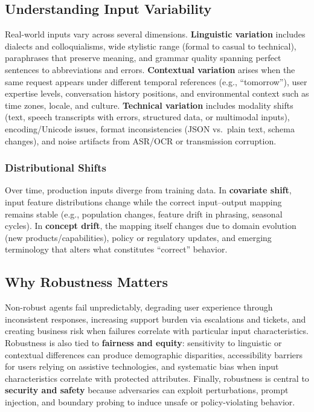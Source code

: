 \begin{TNtwocol}
\subsection*{Understanding Input Variability}

Real-world inputs vary across several dimensions. \textbf{Linguistic variation} includes dialects and colloquialisms, wide stylistic range (formal to casual to technical), paraphrases that preserve meaning, and grammar quality spanning perfect sentences to abbreviations and errors. \textbf{Contextual variation} arises when the same request appears under different temporal references (e.g., ``tomorrow''), user expertise levels, conversation history positions, and environmental context such as time zones, locale, and culture. \textbf{Technical variation} includes modality shifts (text, speech transcripts with errors, structured data, or multimodal inputs), encoding/Unicode issues, format inconsistencies (JSON vs.\ plain text, schema changes), and noise artifacts from ASR/OCR or transmission corruption.

\subsubsection*{Distributional Shifts}
Over time, production inputs diverge from training data. In \textbf{covariate shift}, input feature distributions change while the correct input--output mapping remains stable (e.g., population changes, feature drift in phrasing, seasonal cycles). In \textbf{concept drift}, the mapping itself changes due to domain evolution (new products/capabilities), policy or regulatory updates, and emerging terminology that alters what constitutes ``correct'' behavior.

\subsection*{Why Robustness Matters}
Non-robust agents fail unpredictably, degrading user experience through inconsistent responses, increasing support burden via escalations and tickets, and creating business risk when failures correlate with particular input characteristics. Robustness is also tied to \textbf{fairness and equity}: sensitivity to linguistic or contextual differences can produce demographic disparities, accessibility barriers for users relying on assistive technologies, and systematic bias when input characteristics correlate with protected attributes. Finally, robustness is central to \textbf{security and safety} because adversaries can exploit perturbations, prompt injection, and boundary probing to induce unsafe or policy-violating behavior.


\end{TNtwocol}
